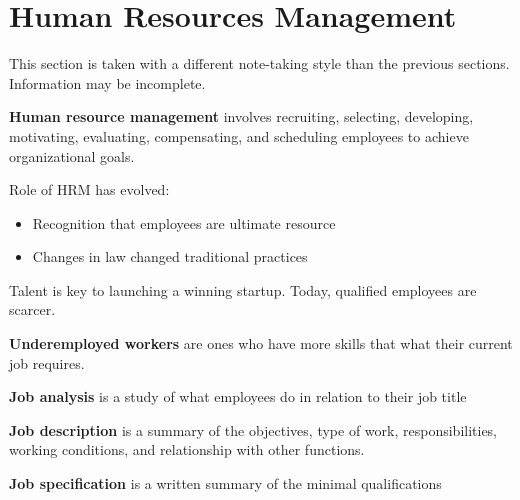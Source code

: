 \documentclass[english, 12pt]{article}
\begin{document}
\section{Human Resources Management}
\begin{note}
This section is taken with a different note-taking style than the previous sections. Information may be incomplete.
\end{note}
\begin{defn}
\textbf{Human resource management} involves recruiting, selecting, developing, motivating, evaluating, compensating, and scheduling employees to achieve organizational goals.
\end{defn}
Role of HRM has evolved:
\begin{itemize}
\item Recognition that employees are ultimate resource
\item Changes in law changed traditional practices
\end{itemize}
Talent is key to launching a winning startup. Today, qualified employees are scarcer.
\begin{defn}
\textbf{Underemployed workers} are ones who have more skills that what their current job requires.
\end{defn}
\begin{defn}
\textbf{Job analysis} is a study of what employees do in relation to their job title
\end{defn}
\begin{defn}
\textbf{Job description} is a summary of the objectives, type of work, responsibilities, working conditions, and relationship with other functions.
\end{defn}
\begin{defn}
\textbf{Job specification} is a written summary of the minimal qualifications
\end{defn}
\end{document}
